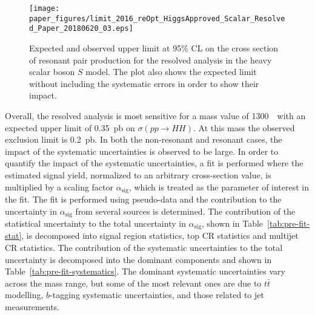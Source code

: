  
\begin{figure}[!h]
\begin{center}
\texttt{[image: paper\_figures/limit\_2016\_reOpt\_HiggsApproved\_Scalar\_Resolved\_Paper\_20180620\_03.eps]}
\caption{Expected and observed upper limit at 95\% CL on the cross section of resonant pair
         production for the resolved analysis in the heavy scalar boson $S$ model. The plot also shows the expected limit
         without including the systematic errors in order to show their impact.
          }
\label{fig:limit}
\end{center}
\end{figure}
 
 
Overall, the resolved analysis is most sensitive for a mass value of 1300~\GeV\ with an
expected upper limit of 0.35~pb on $\sigma(pp \to HH)$. At this mass the observed exclusion limit  is 0.2~pb.
In both the non-resonant and resonant cases, the impact of the
systematic uncertainties is observed to be large.
In order to quantify the impact of the
systematic uncertainties, a fit is performed where the estimated
signal yield,  normalized to an arbitrary cross-section value, is multiplied
by a scaling factor $\alpha_{\mathrm{sig}}$, which is treated as
the parameter of interest in the fit.
The fit is performed using pseudo-data and the contribution to the  uncertainty in
$\alpha_{\mathrm{sig}}$ from several sources is determined. The contribution of the statistical uncertainty  to the total
uncertainty in $\alpha_{\mathrm{sig}}$, shown in Table~\ref{tab:pre-fit-stat},  is decomposed into
signal region statistics, top CR statistics and multijet CR
statistics. The contribution of the systematic uncertainties to the
total uncertainty is decomposed into the dominant components and shown in Table~\ref{tab:pre-fit-systematics}. The dominant
systematic uncertainties vary across the mass range, but some of the most relevant ones are due to $t \bar{t}$ modelling, $b$-tagging systematic uncertainties, and those related to jet measurements.
 
